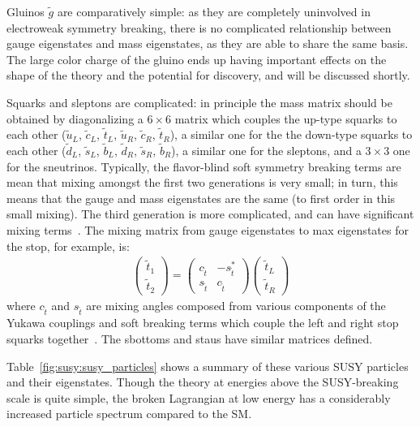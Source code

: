 Gluinos $\tilde{g}$ are comparatively simple: as they are completely uninvolved in electroweak symmetry breaking, there is no complicated relationship between gauge eigenstates and mass eigenstates, as they are able to share the same basis. The large color charge of the gluino ends up having important effects on the shape of the theory and the potential for discovery, and will be discussed shortly.

Squarks and sleptons are complicated: in principle the mass matrix should be obtained by diagonalizing a $6\times6$ matrix which couples the up-type squarks to each other ($\tilde{u}_L$, $\tilde{c}_L$, $\tilde{t}_L$, $\tilde{u}_R$, $\tilde{c}_R$, $\tilde{t}_R$), a similar one for the the down-type squarks to each other ($\tilde{d}_L$, $\tilde{s}_L$, $\tilde{b}_L$, $\tilde{d}_R$, $\tilde{s}_R$, $\tilde{b}_R$), a similar one for the sleptons, and a $3\times3$ one for the sneutrinos. Typically, the flavor-blind soft symmetry breaking terms are mean that mixing amongst the first two generations is very small; in turn, this means that the gauge and mass eigenstates are the same (to first order in this small mixing). The third generation is more complicated, and can have significant mixing terms~\cite{Martin1997}. The mixing matrix from gauge eigenstates to max eigenstates for the stop, for example, is:
%
\begin{align}
\left(\begin{array}{c}
\tilde{t}_1\\
\tilde{t}_2
\end{array} \right) = 
\left( \begin{array}{cc}
c_{\tilde{t}} & -s_{\tilde{t}}^* \\
s_{\tilde{t}} & c_{\tilde{t}}
\end{array}\right)
\left(\begin{array}{c}
\tilde{t}_L\\
\tilde{t}_R
\end{array} \right)
\end{align}
%
where $c_{\tilde{t}}$ and $s_{\tilde{t}}$ are mixing angles composed from various components of the Yukawa couplings and soft breaking terms which couple the left and right stop squarks together~\cite{Martin1997}. The sbottoms and staus have similar matrices defined.

Table~\ref{fig:susy:susy_particles} shows a summary of these various SUSY particles and their eigenstates. Though the theory at energies above the SUSY-breaking scale is quite simple, the broken Lagrangian at low energy has a considerably increased particle spectrum compared to the SM.


